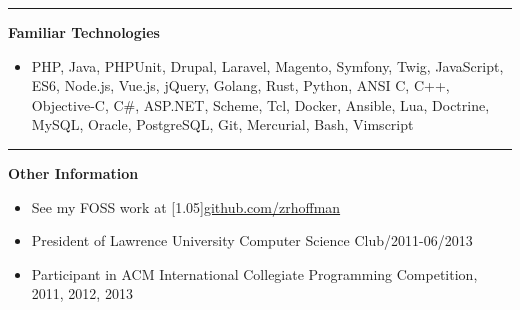 \documentclass[letterpaper, 11pt]{article}
\newcommand{\resumetitle}[1]{
    \flushleft\textbf{#1}
}
\newcommand{\dotnormalline}[2]{#1\dotfill#2}
\begin{document}
\hrule\vspace{0.3cm}

{
    \resumetitle{Familiar Technologies}\vspace{-0.05cm}
    \begin{itemize}[label={}]
        \item PHP, Java, PHPUnit, Drupal, Laravel, Magento, Symfony, Twig, JavaScript, ES6, Node.js, Vue.js, jQuery, Golang, Rust, Python, ANSI C, C++, Objective-C, C\#, ASP.NET, Scheme, Tcl, Docker, Ansible, Lua, Doctrine, MySQL, Oracle, PostgreSQL, Git, Mercurial, Bash, Vimscript
    \end{itemize}
}

\hrule\vspace{0.3cm}

\resumetitle{Other Information}
\begin{itemize}
    \item See my FOSS work at \scalebox{1.05}[1.05]{\large{\href{https://github.com/zrhoffman}{\textsf{github.com/zrhoffman}}}}\small
    \item \dotnormalline{President of Lawrence University Computer Science Club}{01/2011-06/2013}
    \item \dotnormalline{Participant in ACM International Collegiate Programming Competition}{2010, 2011, 2012, 2013}
\end{itemize}
\end{document}
